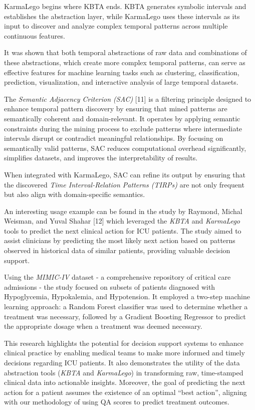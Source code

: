 \documentclass[
]{article}
\begin{document}
KarmaLego begins where KBTA ends. KBTA generates symbolic intervals and
establishes the abstraction layer, while KarmaLego uses these intervals
as its input to discover and analyze complex temporal patterns across
multiple continuous features.

It was shown that both temporal abstractions of raw data and
combinations of these abstractions, which create more complex temporal
patterns, can serve as effective features for machine learning tasks
such as clustering, classification, prediction, visualization, and
interactive analysis of large temporal datasets.

The \emph{Semantic Adjacency Criterion (SAC)} {[}11{]} is a filtering
principle designed to enhance temporal pattern discovery by ensuring
that mined patterns are semantically coherent and domain-relevant. It
operates by applying semantic constraints during the mining process to
exclude patterns where intermediate intervals disrupt or contradict
meaningful relationships. By focusing on semantically valid patterns,
SAC reduces computational overhead significantly, simplifies datasets,
and improves the interpretability of results.

When integrated with KarmaLego, SAC can refine its output by ensuring
that the discovered \emph{Time Interval-Relation Patterns (TIRPs)} are
not only frequent but also align with domain-specific semantics.

An interesting usage example can be found in the study by Raymond,
Michal Weisman, and Yuval Shahar {[}12{]} which leveraged the
\emph{KBTA} and \emph{KarmaLego} tools to predict the next clinical
action for ICU patients. The study aimed to assist clinicians by
predicting the most likely next action based on patterns observed in
historical data of similar patients, providing valuable decision
support.

Using the \emph{MIMIC-IV} dataset - a comprehensive repository of
critical care admissions - the study focused on subsets of patients
diagnosed with Hypoglycemia, Hypokalemia, and Hypotension. It employed a
two-step machine learning approach: a Random Forest classifier was used
to determine whether a treatment was necessary, followed by a Gradient
Boosting Regressor to predict the appropriate dosage when a treatment
was deemed necessary.

This research highlights the potential for decision support systems to
enhance clinical practice by enabling medical teams to make more
informed and timely decisions regarding ICU patients. It also
demonstrates the utility of the data abstraction tools (\emph{KBTA} and
\emph{KarmaLego}) in transforming raw, time-stamped clinical data into
actionable insights. Moreover, the goal of predicting the next action
for a patient assumes the existence of an optimal ``best action'',
aligning with our methodology of using QA scores to predict treatment
outcomes.
\end{document}
